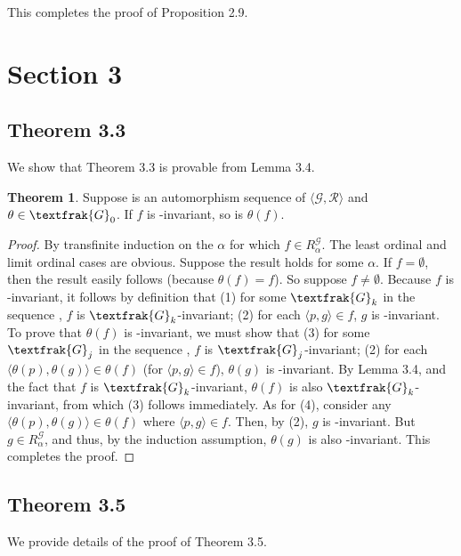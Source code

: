 \documentclass{article}
\theoremstyle{definition}
\newtheorem{theorem}{Theorem}[section]
\begin{document}
This completes the proof of Proposition 2.9.

\section*{Section 3}

\subsection*{Theorem 3.3}
We show that Theorem 3.3 is provable from Lemma 3.4.

\begin{theorem}
Suppose  is an automorphism sequence of $\langle\mathcal{G},\mathcal{R}\rangle$ and $\theta\in\textfrak{G}_0$. 
If $f$ is -invariant, so is $\theta(f)$.
\end{theorem}

\begin{proof}
By transfinite induction on the $\alpha$ for which $f\in R^\mathcal{G}_\alpha$. 
The least ordinal and limit ordinal cases are obvious. Suppose the result holds for some $\alpha$. If 
$f=\emptyset$, then the result easily follows (because $\theta(f)=f$). So suppose $f\ne\emptyset$. Because 
$f$ is -invariant, it follows by definition that (1) for some 
$\textfrak{G}_k$ in the sequence , $f$ is $\textfrak{G}_k$-invariant; (2) for each 
$\langle p,g\rangle\in f$, $g$ is -invariant. To prove that 
$\theta(f)$ is -invariant, we must show that (3) for some 
$\textfrak{G}_j$ in the sequence , $f$ is $\textfrak{G}_j$-invariant; (2) for each
$\langle\theta(p),\theta(g)\rangle\in\theta(f)$ (for $\langle p,g\rangle\in f$), $\theta(g)$ is 
-invariant. By Lemma 3.4, and the fact that $f$ is $\textfrak{G}_k$-invariant, 
$\theta(f)$ is also $\textfrak{G}_k$-invariant, from which (3) follows immediately. As for 
(4), consider any $\langle\theta(p),\theta(g)\rangle\in\theta(f)$ where $\langle p,g\rangle\in f$. Then, by 
(2), $g$ is -invariant. But $g\in R^\mathcal{G}_\alpha$, and thus, by the induction assumption, 
$\theta(g)$ is also -invariant. This completes the proof.

\end{proof}

\subsection*{Theorem 3.5}
We provide details of the proof of Theorem 3.5.
\end{document}
